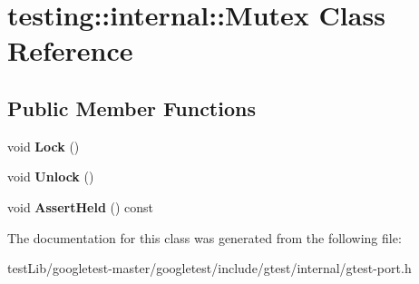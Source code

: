 \hypertarget{classtesting_1_1internal_1_1Mutex}{}\section{testing\+:\+:internal\+:\+:Mutex Class Reference}
\label{classtesting_1_1internal_1_1Mutex}
\subsection*{Public Member Functions}
\begin{DoxyCompactItemize}
\item 
\mbox{\label{classtesting_1_1internal_1_1Mutex_ae7e2191886c00182176b23c4f4d049f8}} 
void {\bfseries Lock} ()
\item 
\mbox{\label{classtesting_1_1internal_1_1Mutex_a315188055de1be98884519ad84eff2e6}} 
void {\bfseries Unlock} ()
\item 
\mbox{\label{classtesting_1_1internal_1_1Mutex_af45bf1660ac4110338a02a8680b2f486}} 
void {\bfseries Assert\+Held} () const
\end{DoxyCompactItemize}


The documentation for this class was generated from the following file\+:\begin{DoxyCompactItemize}
\item 
test\+Lib/googletest-\/master/googletest/include/gtest/internal/gtest-\/port.\+h\end{DoxyCompactItemize}
